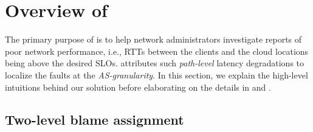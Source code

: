 \section{Overview of {\name}}
\label{sec:overview}

The primary purpose of {\name} is to help network administrators investigate reports of poor network performance, i.e., RTTs between the clients and the cloud locations being above the desired SLOs. {\name} attributes such {\em path-level} latency degradations to localize the faults at the {\em AS-granularity}. %
In this section, we explain the high-level intuitions behind our solution before elaborating on the details in  and . 


\subsection{Two-level blame assignment}
\label{subsec:two-level}

